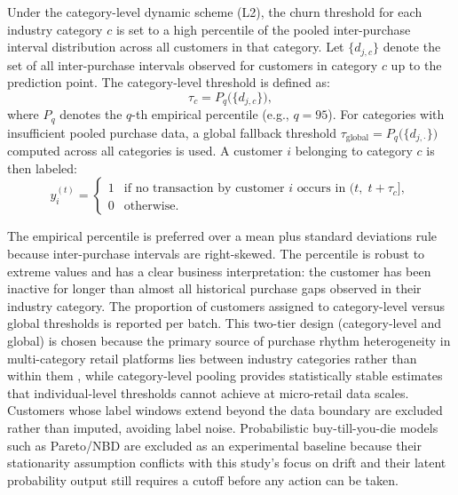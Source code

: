 Under the category-level dynamic scheme (L2), the churn threshold for each industry category $c$ is set to a high percentile of the pooled inter-purchase interval distribution across all customers in that category. Let $\{d_{j,c}\}$ denote the set of all inter-purchase intervals observed for customers in category $c$ up to the prediction point. The category-level threshold is defined as:
\begin{equation}
  \tau_c = P_q\!\bigl(\{d_{j,c}\}\bigr),
  \label{eq:threshold-dynamic}
\end{equation}
where $P_q$ denotes the $q$-th empirical percentile (e.g., $q = 95$). For categories with insufficient pooled purchase data, a global fallback threshold $\tau_{\text{global}} = P_q\!\bigl(\{d_{j,\cdot}\}\bigr)$ computed across all categories is used. A customer $i$ belonging to category $c$ is then labeled:
\begin{equation}
  y_i^{(t)} =
  \begin{cases}
    1 & \text{if no transaction by customer } i \text{ occurs in } (t, \; t + \tau_c], \\
    0 & \text{otherwise.}
  \end{cases}
  \label{eq:label-dynamic}
\end{equation}

The empirical percentile is preferred over a mean plus standard deviations rule because inter-purchase intervals are right-skewed. The percentile is robust to extreme values and has a clear business interpretation: the customer has been inactive for longer than almost all historical purchase gaps observed in their industry category. The proportion of customers assigned to category-level versus global thresholds is reported per batch. This two-tier design (category-level and global) is chosen because the primary source of purchase rhythm heterogeneity in multi-category retail platforms lies between industry categories rather than within them \citep{singh2023retailchurn, europanel2023categorychurn}, while category-level pooling provides statistically stable estimates that individual-level thresholds cannot achieve at micro-retail data scales. Customers whose label windows extend beyond the data boundary are excluded rather than imputed, avoiding label noise. Probabilistic buy-till-you-die models such as Pareto/NBD \cite{fader2009} are excluded as an experimental baseline because their stationarity assumption conflicts with this study's focus on drift and their latent probability output still requires a cutoff before any action can be taken.

